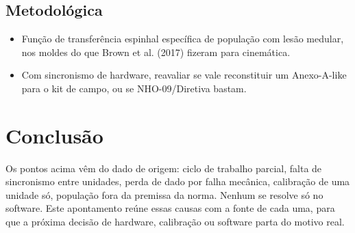 \documentclass[11pt,a4paper]{article}
\begin{document}
\subsection{Metodológica}
\begin{itemize}
\item Função de transferência espinhal específica de população com lesão
medular, nos moldes do que Brown et al. (2017) fizeram para cinemática.
\item Com sincronismo de hardware, reavaliar se vale reconstituir um
Anexo-A-like para o kit de campo, ou se NHO-09/Diretiva bastam.
\end{itemize}

\section{Conclusão}

Os pontos acima vêm do dado de origem: ciclo de trabalho parcial, falta
de sincronismo entre unidades, perda de dado por falha mecânica,
calibração de uma unidade só, população fora da premissa da norma.
Nenhum se resolve só no software. Este apontamento reúne essas causas com
a fonte de cada uma, para que a próxima decisão de hardware, calibração
ou software parta do motivo real.
\end{document}
